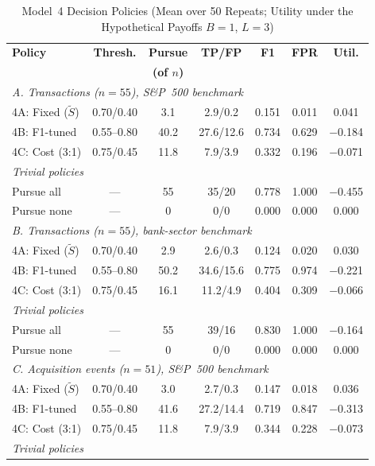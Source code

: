 \begin{table}[!t]
\caption{Model~4 Decision Policies (Mean over 50 Repeats; Utility under the Hypothetical Payoffs $B=1$, $L=3$)}
\label{tab:model4}
\centering
\footnotesize
\setlength{\tabcolsep}{2.5pt}
\begin{tabular}{lcccccc}
\toprule
\textbf{Policy} & \textbf{Thresh.} & \textbf{Pursue} & \textbf{TP/FP} & \textbf{F1} & \textbf{FPR} & \textbf{Util.} \\
 & & \textbf{(of $n$)} & & & & \\
\midrule
\multicolumn{7}{l}{\textit{A. Transactions ($n=55$), S\&P~500 benchmark}} \\
4A: Fixed ($\tilde S$) & 0.70/0.40 & 3.1 & 2.9/0.2 & 0.151 & 0.011 & 0.041 \\
4B: F1-tuned & 0.55--0.80 & 40.2 & 27.6/12.6 & 0.734 & 0.629 & $-$0.184 \\
4C: Cost (3:1) & 0.75/0.45 & 11.8 & 7.9/3.9 & 0.332 & 0.196 & $-$0.071 \\
\multicolumn{7}{l}{\textit{Trivial policies}} \\
Pursue all & --- & 55 & 35/20 & 0.778 & 1.000 & $-$0.455 \\
Pursue none & --- & 0 & 0/0 & 0.000 & 0.000 & 0.000 \\
\midrule
\multicolumn{7}{l}{\textit{B. Transactions ($n=55$), bank-sector benchmark}} \\
4A: Fixed ($\tilde S$) & 0.70/0.40 & 2.9 & 2.6/0.3 & 0.124 & 0.020 & 0.030 \\
4B: F1-tuned & 0.55--0.80 & 50.2 & 34.6/15.6 & 0.775 & 0.974 & $-$0.221 \\
4C: Cost (3:1) & 0.75/0.45 & 16.1 & 11.2/4.9 & 0.404 & 0.309 & $-$0.066 \\
\multicolumn{7}{l}{\textit{Trivial policies}} \\
Pursue all & --- & 55 & 39/16 & 0.830 & 1.000 & $-$0.164 \\
Pursue none & --- & 0 & 0/0 & 0.000 & 0.000 & 0.000 \\
\midrule
\multicolumn{7}{l}{\textit{C. Acquisition events ($n=51$), S\&P~500 benchmark}} \\
4A: Fixed ($\tilde S$) & 0.70/0.40 & 3.0 & 2.7/0.3 & 0.147 & 0.018 & 0.036 \\
4B: F1-tuned & 0.55--0.80 & 41.6 & 27.2/14.4 & 0.719 & 0.847 & $-$0.313 \\
4C: Cost (3:1) & 0.75/0.45 & 11.8 & 7.9/3.9 & 0.344 & 0.228 & $-$0.073 \\
\multicolumn{7}{l}{\textit{Trivial policies}} \\

\end{tabular}
\end{table}

